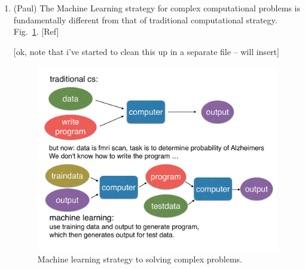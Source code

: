 \documentclass[aps,prb,floatfix,amsmath,amssymb,amsfonts,10pt,floatfix,longbibliography]{revtex4-1}
\begin{document}
\begin{enumerate}


\item (Paul) The Machine Learning strategy for complex computational problems is fundamentally different from that of traditional computational strategy. Fig.~\ref{fig:complex}. {\color{blue}[Ref]} 

[ok, note that i've started to clean this up in a separate file -- will insert]

\begin{figure}[h]
\includegraphics[width=.4\textwidth]{Figures/CS-modes-flow.pdf}
\caption{\label{fig:complex}
Machine learning strategy to solving complex problems.}
\end{figure}



\end{enumerate}
\end{document}
